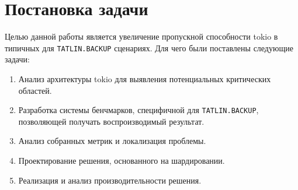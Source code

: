 
\section{Постановка задачи}
\label{sec:task}

Целью данной работы является увеличение пропускной способности tokio в типичных для \verb|TATLIN.BACKUP| сценариях. Для чего были поставлены следующие задачи:

\begin{enumerate}
    \item Анализ архитектуры tokio для выявления потенциальных критических областей.
    \item Разработка системы бенчмарков, специфичной для \verb|TATLIN.BACKUP|, позволяющей получать воспроизводимый результат.
    \item Анализ собранных метрик и локализация проблемы.
    \item Проектирование решения, основанного на шардировании.
    \item Реализация и анализ производительности решения.
\end{enumerate}
